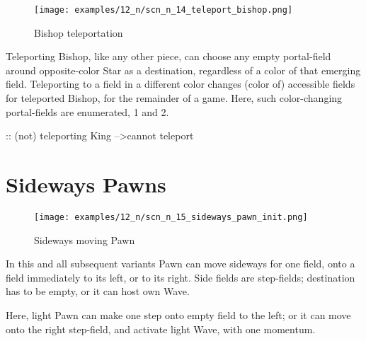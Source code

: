 \vspace*{-1.4\baselineskip}
\noindent
\begin{figure}[!h]
\texttt{[image: examples/12\_n/scn\_n\_14\_teleport\_bishop.png]}
\caption{Bishop teleportation}
\label{fig:scn_n_14_teleport_bishop}
\end{figure}

Teleporting Bishop, like any other piece, can choose any empty portal-field
around opposite-color Star as a destination, regardless of a color of that
emerging field. Teleporting to a field in a different color changes (color of)
accessible fields for teleported Bishop, for the remainder of a game. Here,
such color-changing portal-fields are enumerated, 1 and 2.

\TODO :: (not) teleporting King --\textgreater cannot teleport

\clearpage %

\section*{Sideways Pawns}
\label{sec:Nineteen/Sideways Pawns}

\vspace*{-1.5\baselineskip}
\noindent
\begin{figure}[!h]
\texttt{[image: examples/12\_n/scn\_n\_15\_sideways\_pawn\_init.png]}
\vspace*{-1.4\baselineskip}
\caption{Sideways moving Pawn}
\label{fig:scn_n_15_sideways_pawn_init}
\end{figure}

\vspace*{-0.5\baselineskip}
In this and all subsequent variants Pawn can move sideways for one field, onto a field
immediately to its left, or to its right. Side fields are step-fields; destination has
to be empty, or it can host own Wave.

Here, light Pawn can make one step onto empty field to the left; or it can move onto
the right step-field, and activate light Wave, with one momentum.

\clearpage %

